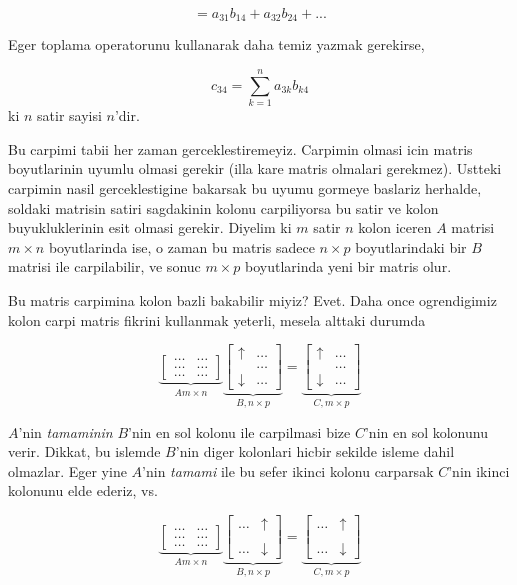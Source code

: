 \documentclass[12pt,fleqn]{article}\usepackage{../common}
\begin{document}
$$ = a_{31}b_{14} + a_{32}b_{24} + ... $$

Eger toplama operatorunu kullanarak daha temiz yazmak gerekirse,

$$ c_{34} = \sum_{k=1}^{n} a_{3k}b_{k4} $$
ki $n$ satir sayisi $n$'dir. 

Bu carpimi tabii her zaman gerceklestiremeyiz. Carpimin olmasi icin matris
boyutlarinin uyumlu olmasi gerekir (illa kare matris olmalari
gerekmez). Ustteki carpimin nasil gerceklestigine bakarsak bu uyumu gormeye
baslariz herhalde, soldaki matrisin satiri sagdakinin kolonu carpiliyorsa
bu satir ve kolon buyukluklerinin esit olmasi gerekir. Diyelim ki $m$ satir
$n$ kolon iceren $A$ matrisi $m \times n$ boyutlarinda ise, o zaman bu
matris sadece $n \times p$ boyutlarindaki bir $B$ matrisi ile
carpilabilir, ve sonuc $m \times p$ boyutlarinda yeni bir matris olur. 

Bu matris carpimina kolon bazli bakabilir miyiz? Evet. Daha once
ogrendigimiz kolon carpi matris fikrini kullanmak yeterli, mesela alttaki
durumda

$$ 
\underbrace{
\left[\begin{array}{rr}
\dots & \dots   \\
\dots & \dots   \\
\dots & \dots 
\end{array}\right]
}_{A m \times n}
\underbrace{
\left[\begin{array}{rr}
\uparrow &  \dots\\
&  \dots\\
\downarrow & \dots 
\end{array}\right] 
}_{B, n \times p}
=
\underbrace{
\left[\begin{array}{rr}
\uparrow &  \dots \\
&  \dots \\
\downarrow & \dots
\end{array}\right] 
}_{C, m \times p}
$$

$A$'nin {\em tamaminin} $B$'nin en sol kolonu ile carpilmasi bize $C$'nin
en sol kolonunu verir. Dikkat, bu islemde $B$'nin diger kolonlari hicbir
sekilde isleme dahil olmazlar. Eger yine $A$'nin {\em tamami} ile bu sefer
ikinci kolonu carparsak $C$'nin ikinci kolonunu elde ederiz, vs.

$$ 
\underbrace{
\left[\begin{array}{rr}
\dots & \dots   \\
\dots & \dots   \\
\dots & \dots 
\end{array}\right]
}_{A m \times n}
\underbrace{
\left[\begin{array}{rr}
\dots & \uparrow \\
& \\
\dots & \downarrow
\end{array}\right] 
}_{B, n \times p}
=
\underbrace{
\left[\begin{array}{rr}
\dots & \uparrow \\
& \\
\dots & \downarrow
\end{array}\right] 
}_{C, m \times p}
$$
\end{document}

